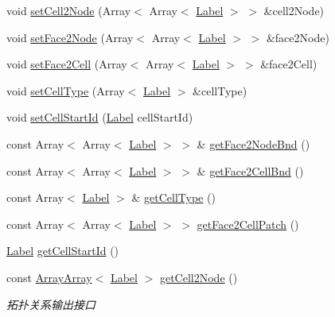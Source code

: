 \begin{DoxyCompactItemize}
\item 
void \hyperlink{classHSF_1_1Topology_a947e781930ba1bbf355970af289e35ba}{setCell2Node} (Array$<$ Array$<$ \hyperlink{namespaceHSF_ae65d72be782e989396ebe5ec6ae4c2b6}{Label} $>$ $>$ \&cell2Node)
\item 
void \hyperlink{classHSF_1_1Topology_ad5dc6fbfb70d53bc41c616b747f5b9a4}{setFace2Node} (Array$<$ Array$<$ \hyperlink{namespaceHSF_ae65d72be782e989396ebe5ec6ae4c2b6}{Label} $>$ $>$ \&face2Node)
\item 
void \hyperlink{classHSF_1_1Topology_a61f5c30ee928367a573f8b4b139ecd8f}{setFace2Cell} (Array$<$ Array$<$ \hyperlink{namespaceHSF_ae65d72be782e989396ebe5ec6ae4c2b6}{Label} $>$ $>$ \&face2Cell)
\item 
void \hyperlink{classHSF_1_1Topology_a42c3fe3a125b6b4576aeea273a9c849c}{setCellType} (Array$<$ \hyperlink{namespaceHSF_ae65d72be782e989396ebe5ec6ae4c2b6}{Label} $>$ \&cellType)
\item 
void \hyperlink{classHSF_1_1Topology_a531b20b476fb3cfc39526e949f20bb27}{setCellStartId} (\hyperlink{namespaceHSF_ae65d72be782e989396ebe5ec6ae4c2b6}{Label} cellStartId)
\item 
const Array$<$ Array$<$ \hyperlink{namespaceHSF_ae65d72be782e989396ebe5ec6ae4c2b6}{Label} $>$ $>$ \& \hyperlink{classHSF_1_1Topology_afda78d036de3096e8da7fe88705b2371}{getFace2NodeBnd} ()
\item 
const Array$<$ Array$<$ \hyperlink{namespaceHSF_ae65d72be782e989396ebe5ec6ae4c2b6}{Label} $>$ $>$ \& \hyperlink{classHSF_1_1Topology_a44ed8e5128084d2385a0dfa8f0fb525c}{getFace2CellBnd} ()
\item 
const Array$<$ \hyperlink{namespaceHSF_ae65d72be782e989396ebe5ec6ae4c2b6}{Label} $>$ \& \hyperlink{classHSF_1_1Topology_a1450bccac8167a83983fc8e91a1a68cf}{getCellType} ()
\item 
const Array$<$ Array$<$ \hyperlink{namespaceHSF_ae65d72be782e989396ebe5ec6ae4c2b6}{Label} $>$ $>$ \hyperlink{classHSF_1_1Topology_a89d020dbaa3624a7b01d10e0c3249f28}{getFace2CellPatch} ()
\item 
\hyperlink{namespaceHSF_ae65d72be782e989396ebe5ec6ae4c2b6}{Label} \hyperlink{classHSF_1_1Topology_ac1ec1876bb50ca29391873e550b11efa}{getCellStartId} ()
\item 
const \hyperlink{classHSF_1_1ArrayArray}{ArrayArray}$<$ \hyperlink{namespaceHSF_ae65d72be782e989396ebe5ec6ae4c2b6}{Label} $>$ \hyperlink{classHSF_1_1Topology_a4773996f5f708d964b87256318266497}{getCell2Node} ()
\begin{DoxyCompactList}\small\item\em 拓扑关系输出接口 \item\end{DoxyCompactList}\item 

\end{DoxyCompactItemize}
